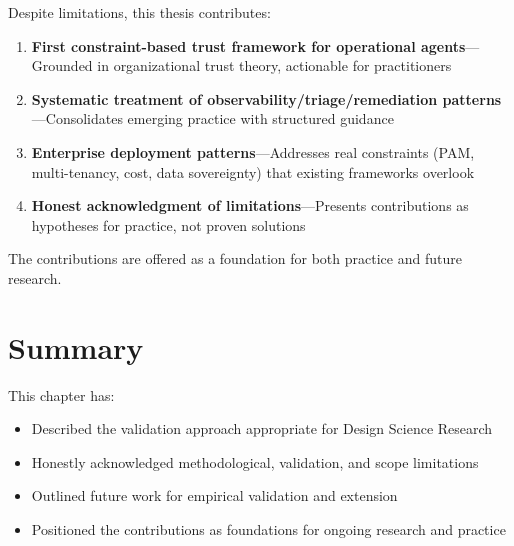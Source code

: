 Despite limitations, this thesis contributes:

\begin{enumerate}
    \item \textbf{First constraint-based trust framework for operational agents}---Grounded in organizational trust theory, actionable for practitioners

    \item \textbf{Systematic treatment of observability/triage/remediation patterns}---Consolidates emerging practice with structured guidance

    \item \textbf{Enterprise deployment patterns}---Addresses real constraints (PAM, multi-tenancy, cost, data sovereignty) that existing frameworks overlook

    \item \textbf{Honest acknowledgment of limitations}---Presents contributions as hypotheses for practice, not proven solutions
\end{enumerate}

The contributions are offered as a foundation for both practice and future research.

\section{Summary}
\label{sec:evaluation-summary}

This chapter has:
\begin{itemize}
    \item Described the validation approach appropriate for Design Science Research
    \item Honestly acknowledged methodological, validation, and scope limitations
    \item Outlined future work for empirical validation and extension
    \item Positioned the contributions as foundations for ongoing research and practice
\end{itemize}
